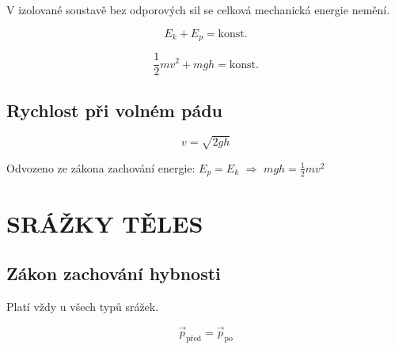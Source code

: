 \documentclass[a4paper,11pt]{article}
\begin{document}
\begin{definitionbox}
V izolované soustavě bez odporových sil se celková mechanická energie nemění.
\end{definitionbox}

\begin{equationbox}
\begin{equation*}
    E_k + E_p = \text{konst.}
\end{equation*}
\end{equationbox}

\begin{equationbox}
\begin{equation*}
    \frac{1}{2}mv^2 + mgh = \text{konst.}
\end{equation*}
\end{equationbox}

\subsection{Rychlost při volném pádu}

\begin{equationbox}
\begin{equation*}
    v = \sqrt{2gh}
\end{equation*}
\end{equationbox}

\begin{notebox}
Odvozeno ze zákona zachování energie: $E_p = E_k$ $\Rightarrow$ $mgh = \frac{1}{2}mv^2$
\end{notebox}

\section{SRÁŽKY TĚLES}

\subsection{Zákon zachování hybnosti}

\begin{definitionbox}
Platí vždy u všech typů srážek.
\end{definitionbox}

\begin{equationbox}
\begin{equation*}
    \vec{p}_{\text{před}} = \vec{p}_{\text{po}}
\end{equation*}
\end{equationbox}
\end{document}
